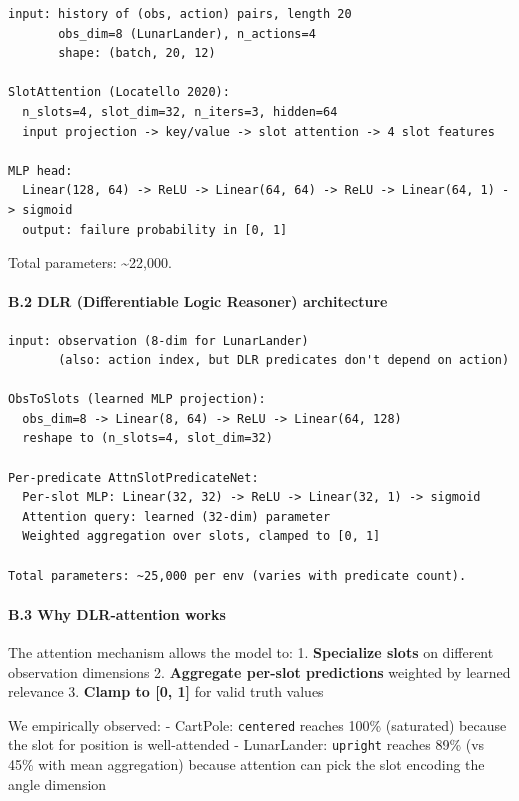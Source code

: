 \documentclass[
]{article}
\begin{document}
\begin{verbatim}
input: history of (obs, action) pairs, length 20
       obs_dim=8 (LunarLander), n_actions=4
       shape: (batch, 20, 12)

SlotAttention (Locatello 2020):
  n_slots=4, slot_dim=32, n_iters=3, hidden=64
  input projection -> key/value -> slot attention -> 4 slot features

MLP head:
  Linear(128, 64) -> ReLU -> Linear(64, 64) -> ReLU -> Linear(64, 1) -> sigmoid
  output: failure probability in [0, 1]
\end{verbatim}

Total parameters: \textasciitilde22,000.

\paragraph{B.2 DLR (Differentiable Logic Reasoner)
architecture}\label{b.2-dlr-differentiable-logic-reasoner-architecture}

\begin{verbatim}
input: observation (8-dim for LunarLander)
       (also: action index, but DLR predicates don't depend on action)

ObsToSlots (learned MLP projection):
  obs_dim=8 -> Linear(8, 64) -> ReLU -> Linear(64, 128)
  reshape to (n_slots=4, slot_dim=32)

Per-predicate AttnSlotPredicateNet:
  Per-slot MLP: Linear(32, 32) -> ReLU -> Linear(32, 1) -> sigmoid
  Attention query: learned (32-dim) parameter
  Weighted aggregation over slots, clamped to [0, 1]

Total parameters: ~25,000 per env (varies with predicate count).
\end{verbatim}

\paragraph{B.3 Why DLR-attention
works}\label{b.3-why-dlr-attention-works}

The attention mechanism allows the model to: 1. \textbf{Specialize
slots} on different observation dimensions 2. \textbf{Aggregate per-slot
predictions} weighted by learned relevance 3. \textbf{Clamp to {[}0,
1{]}} for valid truth values

We empirically observed: - CartPole: \texttt{centered} reaches 100\%
(saturated) because the slot for position is well-attended -
LunarLander: \texttt{upright} reaches 89\% (vs 45\% with mean
aggregation) because attention can pick the slot encoding the angle
dimension
\end{document}
